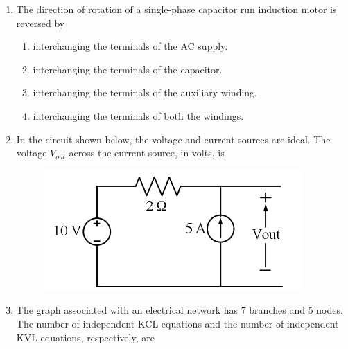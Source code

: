 \documentclass[journal,12pt,onecolumn]{IEEEtran}
\theoremstyle{remark}
\begin{document}
\begin{enumerate}[start=1, label=Q.\arabic*]
    \hfill{}

    \item The direction of rotation of a single-phase capacitor run induction motor is reversed by
    \begin{enumerate}
        \item interchanging the terminals of the AC supply.
        \item interchanging the terminals of the capacitor.
        \item interchanging the terminals of the auxiliary winding.
        \item interchanging the terminals of both the windings.
    \end{enumerate}

    \hfill{}

    \item In the circuit shown below, the voltage and current sources are ideal. The voltage $V_{out}$ across the current source, in volts, is
    \begin{figure}[H]
        \includegraphics[width=0.4\columnwidth]{Figures/2q23.png}
        \centering
        \caption{}
    \end{figure}
    \begin{enumerate}
    \end{enumerate}

    \hfill{}

    \item The graph associated with an electrical network has $7$ branches and $5$ nodes. The number of independent KCL equations and the number of independent KVL equations, respectively, are
    \begin{enumerate}
    \end{enumerate}


\end{enumerate}
\end{document}
